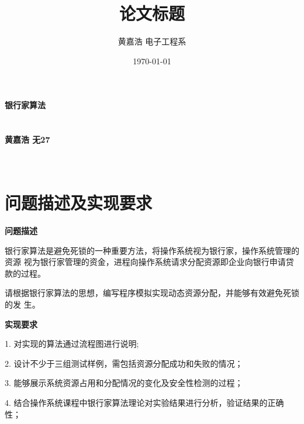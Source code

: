 \documentclass[12pt, a4paper, oneside]{ctexart}
\title{\textbf{论文标题}}
\author{黄嘉浩 \quad 电子工程系 \quad 2022010666}
\date{\today}
\begin{document}
\begin{titlepage}
    \vspace*{\fill}  %
    \begin{center}
        \fontsize{32}{18}\selectfont\textbf{银行家算法} \\
        \vspace{0.5cm}
        \fontsize{20}{18} \\
        \vspace{0.5cm}
        \fontsize{20}{18} \\

        \vspace{2cm}
        \fontsize{18}{18}\selectfont\textbf{黄嘉浩 \quad 无27 }  \\
        \vspace{0.5cm}
        \fontsize{18}{18}\selectfont{huang-jh22@mails.tsinghua.edu.cn}  \\
        \vspace{0.5cm}
        \fontsize{18}{18}\selectfont{\today}\\
    \end{center}
    \vspace*{\fill}  %
\end{titlepage}

\newpage
{}
\setcounter{page}{1}
\tableofcontents

\newpage
\setcounter{page}{1}

\section{问题描述及实现要求}

\textbf{问题描述}

银行家算法是避免死锁的一种重要方法，将操作系统视为银行家，操作系统管理的资源
视为银行家管理的资金，进程向操作系统请求分配资源即企业向银行申请贷款的过程。

请根据银行家算法的思想，编写程序模拟实现动态资源分配，并能够有效避免死锁的发
生。

\textbf{实现要求}

1. 对实现的算法通过流程图进行说明;

2. 设计不少于三组测试样例，需包括资源分配成功和失败的情况；

3. 能够展示系统资源占用和分配情况的变化及安全性检测的过程；

4. 结合操作系统课程中银行家算法理论对实验结果进行分析，验证结果的正确性；
\end{document}
